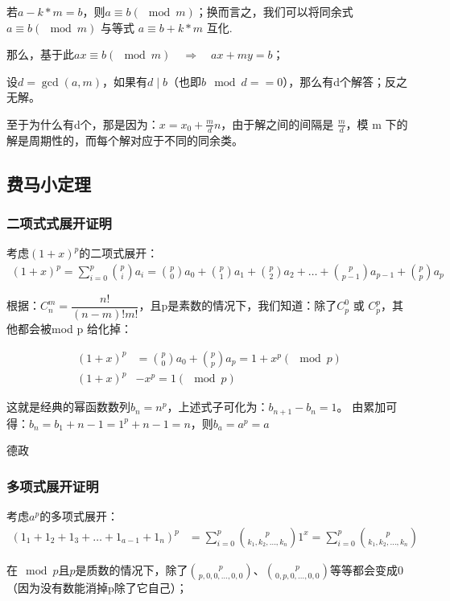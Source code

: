 \documentclass[12pt]{article}
\begin{document}
若$a-k*m=b$，则$a\equiv b(\mod m)$；换而言之，我们可以将同余式 $a\equiv b(\mod m)$ 与等式 $a\equiv b+k*m$ 互化.

那么，基于此$ax\equiv b(\mod m) \quad \Rightarrow \quad ax+my=b$；

设$d=\gcd(a,m)$，如果有$d \mid b$（也即$b\mod d == 0$），那么有d个解答；反之无解。

至于为什么有d个，那是因为：$x=x_{0}+\frac{m}{d}n$，由于解之间的间隔是 $\frac{m}{d}$，模 
m 下的解是周期性的，而每个解对应于不同的同余类。


\subsection{费马小定理}

\subsubsection{二项式式展开证明}
考虑$(1+x)^{p}$的二项式展开：
\begin{align*}
    (1+x)^{p} = \sum_{i=0}^{p}\binom{p}{i}a_{i} = \binom{p}{0}a_{0} + \binom{p}{1}a_{1} + \binom{p}{2}a_{2} + \dots + \binom{p}{p-1}a_{p-1} + \binom{p}{p}a_{p}
\end{align*}

根据：$C_{n}^m=\dfrac{n!}{(n-m)!m!}$，且p是素数的情况下，我们知道：除了$C_{p}^{0}$ 或 $C_{p}^{p}$，其他都会被mod p 给化掉：

\begin{align*}
    (1+x)^{p} &= \binom{p}{0}a_{0} + \binom{p}{p}a_{p} = 1+x^{p} (\mod p)\\ 
    (1+x)^{p} &- x^{p} = 1 (\mod p)
\end{align*}

这就是经典的幂函数数列$b_{n}=n^{p}$，上述式子可化为：$b_{n+1}-b_{n}=1$。
由累加可得：$b_{n}=b_{1}+n-1=1^{p}+n-1=n$，则$b_{a}=a^{p}=a$

德政

\subsubsection{多项式展开证明}
考虑$a^{p}$的多项式展开：
\begin{align*}
    (1_{1}+1_{2}+1_{3}+\dots+1_{a-1}+1_{n})^{p}&=\sum_{i=0}^p\binom{p}{k_{1},k_{2},\dots,k_{n}}1^{x}=\sum_{i=0}^p\binom{p}{k_{1},k_{2},\dots,k_{n}}
\end{align*}

在$\mod p$且$p$是质数的情况下，除了$\binom{p}{p,0,0,\dots,0,0}$、$\binom{p}{0,p,0,\dots,0,0}$等等都会变成0（因为没有数能消掉p除了它自己）；
\end{document}
